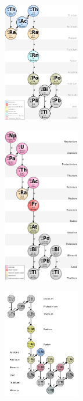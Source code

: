 \documentclass[aspectratio=1610,pdftex,dvipsnames,compress,xcolor={dvipsnames}]{beamer}
\begin{document}
\addtocounter{framenumber}{-1}
\begin{frame}{}
    \begin{figure}
        \centering
        \includegraphics[width=0.30\textwidth]{th232.chain.jpg}
    \end{figure}
\end{frame}


\begin{frame}{}
    \begin{figure}
        \centering
        \includegraphics[width=0.30\textwidth]{np237.chain.jpg}
    \end{figure}
\end{frame}


\begin{frame}{}
    \begin{figure}
        \centering
        \includegraphics[width=0.30\textwidth]{u238.chain.jpg}
    \end{figure}
\end{frame}
\end{document}
